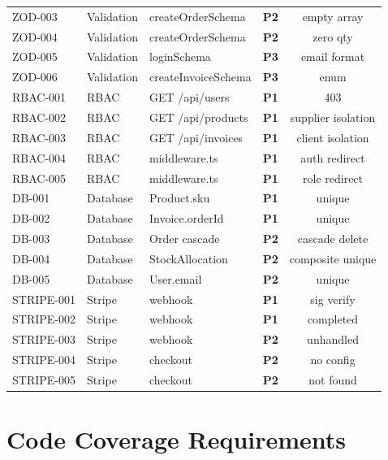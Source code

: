 ﻿\documentclass[12pt,a4paper]{report}
\newcommand{\pone}{\textbf{\color{p1red}P1}}
\newcommand{\ptwo}{\textbf{\color{p2orange}P2}}
\newcommand{\pthree}{\textbf{\color{p3blue}P3}}
\begin{document}
\begin{center}
\begin{longtable}{llllc}
  ZOD-003  & Validation & createOrderSchema & \ptwo & empty array \\
  ZOD-004  & Validation & createOrderSchema & \ptwo & zero qty \\
  ZOD-005  & Validation & loginSchema & \pthree & email format \\
  ZOD-006  & Validation & createInvoiceSchema & \pthree & enum \\
  RBAC-001 & RBAC & GET /api/users & \pone & 403 \\
  RBAC-002 & RBAC & GET /api/products & \pone & supplier isolation \\
  RBAC-003 & RBAC & GET /api/invoices & \pone & client isolation \\
  RBAC-004 & RBAC & middleware.ts & \pone & auth redirect \\
  RBAC-005 & RBAC & middleware.ts & \pone & role redirect \\
  DB-001   & Database & Product.sku & \pone & unique \\
  DB-002   & Database & Invoice.orderId & \pone & unique \\
  DB-003   & Database & Order cascade & \ptwo & cascade delete \\
  DB-004   & Database & StockAllocation & \ptwo & composite unique \\
  DB-005   & Database & User.email & \ptwo & unique \\
  STRIPE-001 & Stripe & webhook & \pone & sig verify \\
  STRIPE-002 & Stripe & webhook & \pone & completed \\
  STRIPE-003 & Stripe & webhook & \ptwo & unhandled \\
  STRIPE-004 & Stripe & checkout & \ptwo & no config \\
  STRIPE-005 & Stripe & checkout & \ptwo & not found \\
  \bottomrule
\end{longtable}
\end{center}

\section{Code Coverage Requirements}
\end{document}
